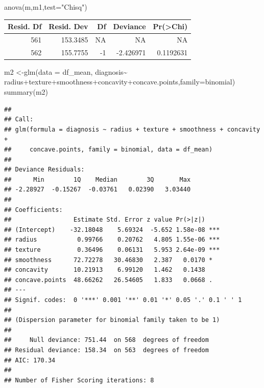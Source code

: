 \documentclass[
  11pt,
]{article}
\newenvironment{Shaded}{\begin{snugshade}}{\end{snugshade}}
\newcommand{\AttributeTok}[1]{\textcolor[rgb]{0.77,0.63,0.00}{#1}}
\newcommand{\FunctionTok}[1]{\textcolor[rgb]{0.00,0.00,0.00}{#1}}
\newcommand{\NormalTok}[1]{#1}
\newcommand{\OtherTok}[1]{\textcolor[rgb]{0.56,0.35,0.01}{#1}}
\newcommand{\SpecialCharTok}[1]{\textcolor[rgb]{0.00,0.00,0.00}{#1}}
\newcommand{\StringTok}[1]{\textcolor[rgb]{0.31,0.60,0.02}{#1}}
\begin{document}
\begin{Shaded}
\begin{Highlighting}[]
\FunctionTok{anova}\NormalTok{(m,m1,}\AttributeTok{test=}\StringTok{"Chisq"}\NormalTok{)}
\end{Highlighting}
\end{Shaded}

\begin{tabular}{r|r|r|r|r}
\hline
Resid. Df & Resid. Dev & Df & Deviance & Pr(>Chi)\\
\hline
561 & 153.3485 & NA & NA & NA\\
\hline
562 & 155.7755 & -1 & -2.426971 & 0.1192631\\
\hline
\end{tabular}

\begin{Shaded}
\begin{Highlighting}[]
\NormalTok{m2 }\OtherTok{\textless{}{-}}\FunctionTok{glm}\NormalTok{(}\AttributeTok{data =}\NormalTok{ df\_mean, diagnosis}\SpecialCharTok{\textasciitilde{}}\NormalTok{ radius}\SpecialCharTok{+}\NormalTok{texture}\SpecialCharTok{+}\NormalTok{smoothness}\SpecialCharTok{+}\NormalTok{concavity}\SpecialCharTok{+}\NormalTok{concave.points,}\AttributeTok{family=}\NormalTok{binomial)}
\FunctionTok{summary}\NormalTok{(m2)}
\end{Highlighting}
\end{Shaded}

\begin{verbatim}
## 
## Call:
## glm(formula = diagnosis ~ radius + texture + smoothness + concavity + 
##     concave.points, family = binomial, data = df_mean)
## 
## Deviance Residuals: 
##      Min        1Q    Median        3Q       Max  
## -2.28927  -0.15267  -0.03761   0.02390   3.03440  
## 
## Coefficients:
##                 Estimate Std. Error z value Pr(>|z|)    
## (Intercept)    -32.18048    5.69324  -5.652 1.58e-08 ***
## radius           0.99766    0.20762   4.805 1.55e-06 ***
## texture          0.36496    0.06131   5.953 2.64e-09 ***
## smoothness      72.72278   30.46830   2.387   0.0170 *  
## concavity       10.21913    6.99120   1.462   0.1438    
## concave.points  48.66262   26.54605   1.833   0.0668 .  
## ---
## Signif. codes:  0 '***' 0.001 '**' 0.01 '*' 0.05 '.' 0.1 ' ' 1
## 
## (Dispersion parameter for binomial family taken to be 1)
## 
##     Null deviance: 751.44  on 568  degrees of freedom
## Residual deviance: 158.34  on 563  degrees of freedom
## AIC: 170.34
## 
## Number of Fisher Scoring iterations: 8
\end{verbatim}
\end{document}
